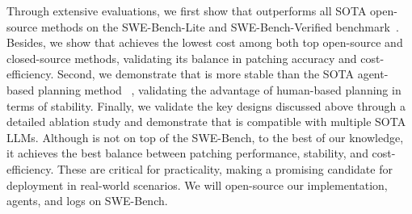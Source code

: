 Through extensive evaluations, we first show that \sys outperforms all SOTA open-source methods on the SWE-Bench-Lite and SWE-Bench-Verified benchmark~\cite{jimenez2023swe}.
Besides, we show that \sys achieves the lowest cost among both top open-source and closed-source methods, validating its balance in patching accuracy and cost-efficiency.
Second, we demonstrate that \sys is more stable than the SOTA agent-based planning method \openhands~\cite{wang2024openhands}, validating the advantage of human-based planning in terms of stability. 
Finally, we validate the key designs discussed above through a detailed ablation study and demonstrate that \sys is compatible with multiple SOTA LLMs. 
Although \sys is not on top of the SWE-Bench, to the best of our knowledge, it achieves the best balance between patching performance, stability, and cost-efficiency. 
These are critical for practicality, making \sys a promising candidate for deployment in real-world scenarios.
We will open-source our implementation, agents, and logs on SWE-Bench.